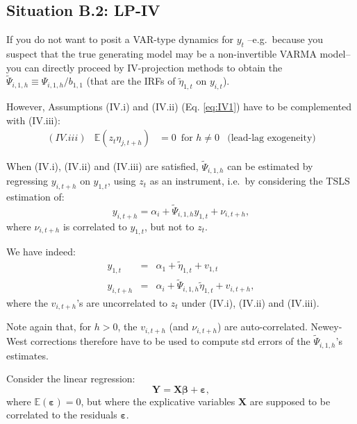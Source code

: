\documentclass[
  12pt,
]{book}
\theoremstyle{definition}
\theoremstyle{definition}
\theoremstyle{definition}
\theoremstyle{definition}
\theoremstyle{remark}
\begin{document}
\hypertarget{situation-b.2-lp-iv}{%
\subsection{Situation B.2: LP-IV}\label{situation-b.2-lp-iv}}

If you do not want to posit a VAR-type dynamics for \(y_t\) --e.g.~because you suspect that the true generating model may be a non-invertible VARMA model-- you can directly proceed by IV-projection methods to obtain the \(\tilde\Psi_{i,1,h}\equiv \Psi_{i,1,h}/b_{1,1}\) (that are the IRFs of \(\tilde\eta_{1,t}\) on \(y_{i,t}\)).

However, Assumptions (IV.i) and (IV.ii) (Eq. \eqref{eq:IV1}) have to be complemented with (IV.iii):
\begin{equation*}
\begin{array}{llll}
(IV.iii) & \mathbb{E}(z_t \eta_{j,t+h}) &= 0 \, \mbox{ for } h \ne 0 & \mbox{(lead-lag exogeneity)}
\end{array}
\end{equation*}

When (IV.i), (IV.ii) and (IV.iii) are satisfied, \(\tilde\Psi_{i,1,h}\) can be estimated by regressing \(y_{i,t+h}\) on \(y_{1,t}\), using \(z_t\) as an instrument, i.e.~by considering the TSLS estimation of:
\begin{equation}
y_{i,t+h} = \alpha_i + \tilde\Psi_{i,1,h}y_{1,t} + \nu_{i,t+h},\label{eq:regIV1}
\end{equation}
where \(\nu_{i,t+h}\) is correlated to \(y_{1,t}\), but not to \(z_t\).

We have indeed:
\begin{eqnarray*}
y_{1,t} &=& \alpha_1 + \tilde\eta_{1,t} + v_{1,t}\\
y_{i,t+h} &=& \alpha_i + \tilde\Psi_{i,1,h}\tilde\eta_{1,t} + v_{i,t+h},
\end{eqnarray*}
where the \(v_{i,t+h}\)'s are uncorrelated to \(z_t\) under (IV.i), (IV.ii) and (IV.iii).

Note again that, for \(h>0\), the \(v_{i,t+h}\) (and \(\nu_{i,t+h}\)) are auto-correlated. Newey-West corrections therefore have to be used to compute std errors of the \(\tilde\Psi_{i,1,h}\)'s estimates.

Consider the linear regression:
\[
\mathbf{Y} = \mathbf{X}\boldsymbol\beta + \boldsymbol\varepsilon,
\]
where \(\mathbb{E}(\boldsymbol\varepsilon)=0\), but where the explicative variables \(\mathbf{X}\) are supposed to be correlated to the residuals \(\boldsymbol\varepsilon\).
\end{document}
